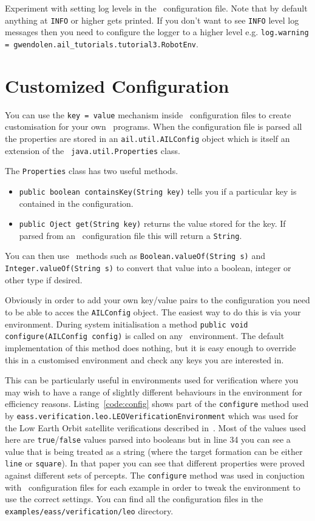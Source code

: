 \documentclass[a4]{article}
\begin{document}
Experiment with setting log levels in the \ail\ configuration file.  Note that by default anything at \texttt{INFO} or higher gets printed.  If you don't want to see \texttt{INFO} level log messages then you need to configure the logger to a higher level e.g. \texttt{log.warning = gwendolen.ail\_tutorials.tutorial3.RobotEnv}.

\section{Customized Configuration}

You can use the \texttt{key = value} mechanism inside \ail\ configuration files to create customisation for your own \ail\ programs.  When the configuration file is parsed all the properties are stored in an \texttt{ail.util.AILConfig} object which is itself an extension of the \java\ \texttt{java.util.Properties} class.  

The \texttt{Properties} class has two useful methods.  
\begin{itemize}
\item \texttt{public boolean containsKey(String key)} tells you if a particular key is contained in the configuration.  
\item \texttt{public Oject get(String key)} returns the value stored for the key.  If parsed from an \ail\ configuration file this will return a \texttt{String}.
\end{itemize}
You can then use \java\ methods such as \texttt{Boolean.valueOf(String s)} and \texttt{Integer.valueOf(String s)} to convert that value into a boolean, integer or other type if desired.

Obviously in order to add your own key/value pairs to the configuration you need to be able to acces the \texttt{AILConfig} object.  The easiest way to do this is via your environment.  During system initialisation a method \texttt{public void configure(AILConfig config)} is called on any \ail\ environment.  The default implementation of this method does nothing, but it is easy enough to override this in a customised environment and check any keys you are interested in.

This can be particularly useful in environments used for verification where you may wish to have a range of slightly different behaviours in the environment for efficiency reasons.  Listing~\ref{code:config} shows part of the \texttt{configure} method used by \texttt{eass.verification.leo.LEOVerificationEnvironment} which was used for the Low Earth Orbit satellite verifications described in~\cite{dennis14:_pract}.  Most of the values used here are \texttt{true}/\texttt{false} values parsed into booleans but in line 34 you can see a value that is being treated as a string (where the target formation can be either \texttt{line} or \texttt{square}).  In that paper you can see that different properties were proved against different sets of percepts.  The \texttt{configure} method was used in conjuction with \ail\ configuration files for each example in order to tweak the environment to use the correct settings.  You can find all the configuration files in the \texttt{examples/eass/verification/leo} directory.
\end{document}
